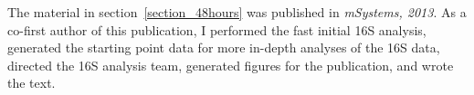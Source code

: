 \documentclass[12pt,chapterheads]{ucsd}
\begin{document}
The material in section~\ref{section_48hours} was published in \textsl{mSystems, 2013}.
As a co-first author of this publication, I performed the fast initial 16S analysis,
generated the starting point data for more in-depth analyses of the 16S data,
directed the 16S analysis team, generated figures for the publication, and wrote the text.







\appendix


\printindex %


\end{document}
